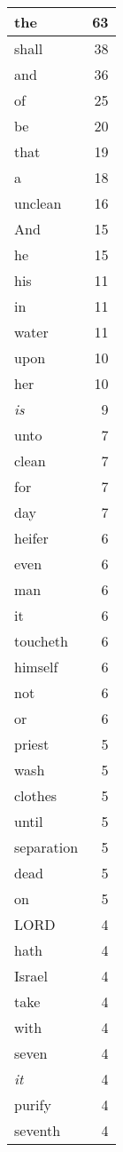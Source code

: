 \begin{center}
\begin{longtable}{l|r}
\hline \hline
\endlastfoot
the & 63 \\ \hline
shall & 38 \\ \hline
and & 36 \\ \hline
of & 25 \\ \hline
be & 20 \\ \hline
that & 19 \\ \hline
a & 18 \\ \hline
unclean & 16 \\ \hline
And & 15 \\ \hline
he & 15 \\ \hline
his & 11 \\ \hline
in & 11 \\ \hline
water & 11 \\ \hline
upon & 10 \\ \hline
her & 10 \\ \hline
\emph{is} & 9 \\ \hline
unto & 7 \\ \hline
clean & 7 \\ \hline
for & 7 \\ \hline
day & 7 \\ \hline
heifer & 6 \\ \hline
even & 6 \\ \hline
man & 6 \\ \hline
it & 6 \\ \hline
toucheth & 6 \\ \hline
himself & 6 \\ \hline
not & 6 \\ \hline
or & 6 \\ \hline
priest & 5 \\ \hline
wash & 5 \\ \hline
clothes & 5 \\ \hline
until & 5 \\ \hline
separation & 5 \\ \hline
dead & 5 \\ \hline
on & 5 \\ \hline
LORD & 4 \\ \hline
hath & 4 \\ \hline
Israel & 4 \\ \hline
take & 4 \\ \hline
with & 4 \\ \hline
seven & 4 \\ \hline
\emph{it} & 4 \\ \hline
purify & 4 \\ \hline
seventh & 4 \\ \hline

\end{longtable}
\end{center}
